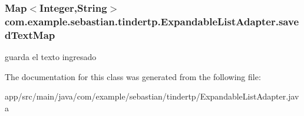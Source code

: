 \subsubsection[{\texorpdfstring{saved\+Text\+Map}{savedTextMap}}]{\setlength{\rightskip}{0pt plus 5cm}Map$<$Integer,String$>$ com.\+example.\+sebastian.\+tindertp.\+Expandable\+List\+Adapter.\+saved\+Text\+Map\hspace{0.3cm}{\ttfamily [private]}}\hypertarget{classcom_1_1example_1_1sebastian_1_1tindertp_1_1ExpandableListAdapter_abde424871e914e8a473529e34eab49ca}{}\label{classcom_1_1example_1_1sebastian_1_1tindertp_1_1ExpandableListAdapter_abde424871e914e8a473529e34eab49ca}
guarda el texto ingresado 

The documentation for this class was generated from the following file\+:\begin{DoxyCompactItemize}
\item 
app/src/main/java/com/example/sebastian/tindertp/Expandable\+List\+Adapter.\+java\end{DoxyCompactItemize}
